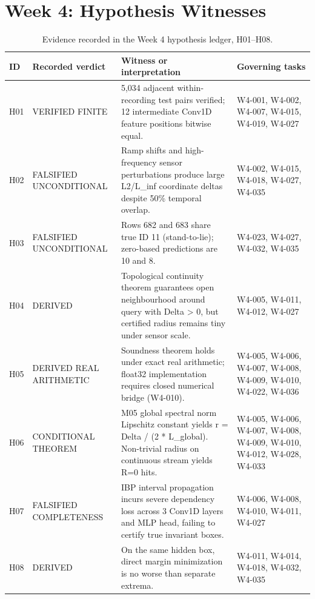 \section{Week 4: Hypothesis Witnesses}
\begin{table}[H]
\caption{Evidence recorded in the Week 4 hypothesis ledger, H01--H08.}
\centering\small
\begin{tabularx}{\textwidth}{@{}lYYY@{}}\toprule
ID & Recorded verdict & Witness or interpretation & Governing tasks\\
\midrule
H01 & VERIFIED FINITE & 5,034 adjacent within-recording test pairs verified; 12 intermediate Conv1D feature positions bitwise equal. & W4-001, W4-002, W4-007, W4-015, W4-019, W4-027\\
H02 & FALSIFIED UNCONDITIONAL & Ramp shifts and high-frequency sensor perturbations produce large L2/L\_inf coordinate deltas despite 50\% temporal overlap. & W4-002, W4-015, W4-018, W4-027, W4-035\\
H03 & FALSIFIED UNCONDITIONAL & Rows 682 and 683 share true ID 11 (stand-to-lie); zero-based predictions are 10 and 8. & W4-023, W4-027, W4-032, W4-035\\
H04 & DERIVED & Topological continuity theorem guarantees open neighbourhood around query with Delta > 0, but certified radius remains tiny under sensor scale. & W4-005, W4-011, W4-012, W4-027\\
H05 & DERIVED REAL ARITHMETIC & Soundness theorem holds under exact real arithmetic; float32 implementation requires closed numerical bridge (W4-010). & W4-005, W4-006, W4-007, W4-008, W4-009, W4-010, W4-022, W4-036\\
H06 & CONDITIONAL THEOREM & M05 global spectral norm Lipschitz constant yields r = Delta / (2 * L\_global). Non-trivial radius on continuous stream yields R=0 hits. & W4-005, W4-006, W4-007, W4-008, W4-009, W4-010, W4-012, W4-028, W4-033\\
H07 & FALSIFIED COMPLETENESS & IBP interval propagation incurs severe dependency loss across 3 Conv1D layers and MLP head, failing to certify true invariant boxes. & W4-006, W4-008, W4-010, W4-011, W4-027\\
H08 & DERIVED & On the same hidden box, direct margin minimization is no worse than separate extrema. & W4-011, W4-014, W4-018, W4-032, W4-035\\
\bottomrule\end{tabularx}
\end{table}
